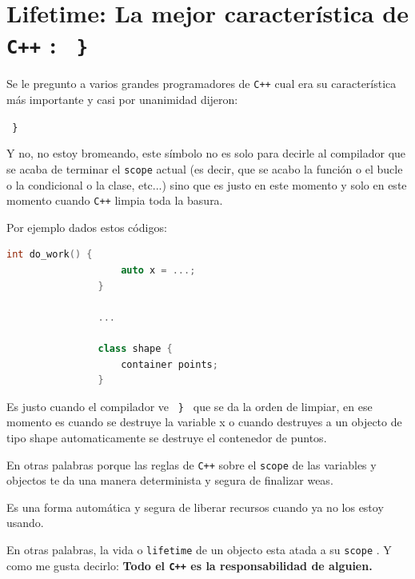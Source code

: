 \documentclass[12pt, fleqn]{report}                             %
\theoremstyle{break}                                            %
\newcommand{\textCode}[1]  { \texttt{#1} }                      %
\newcommand \Cpp  {\textCode{C++} }                               %
\begin{document}
        \clearpage
        \section{Lifetime: La mejor característica de \Cpp: \textCode{ \} } }     
        
            Se le pregunto a varios grandes programadores de \Cpp cual era su
            característica más importante y casi por unanimidad dijeron:

            \textCode{ \} }

            Y no, no estoy bromeando, este símbolo no es solo para decirle al compilador
            que se acaba de terminar el \textCode{scope} actual (es decir, que se acabo 
            la función o el bucle o la condicional o la clase, etc...) sino que es justo
            en este momento y solo en este momento cuando \Cpp limpia toda la basura.

            Por ejemplo dados estos códigos:
            \begin{lstlisting}[language=C++, gobble=16]
                int do_work() {
                    auto x = ...;
                }

                ...

                class shape {
                    container points;
                }
            \end{lstlisting}

            Es justo cuando el compilador ve \textCode{ \} } que se da la orden de limpiar,
            en ese momento es cuando se destruye la variable x o cuando destruyes a un objecto
            de tipo shape automaticamente se destruye el contenedor de puntos.
            
            En otras palabras porque las reglas de \Cpp sobre el \textCode{scope} de las variables
            y objectos te da una manera determinista y segura de finalizar weas.

            Es una forma automática y segura de liberar recursos cuando ya no los estoy usando.

            En otras palabras, la vida o \textCode{lifetime} de un objecto esta atada a su \textCode{scope}.
            Y como me gusta decirlo:
            \textbf{
                Todo el \Cpp es la responsabilidad de alguien.
            }
\end{document}
